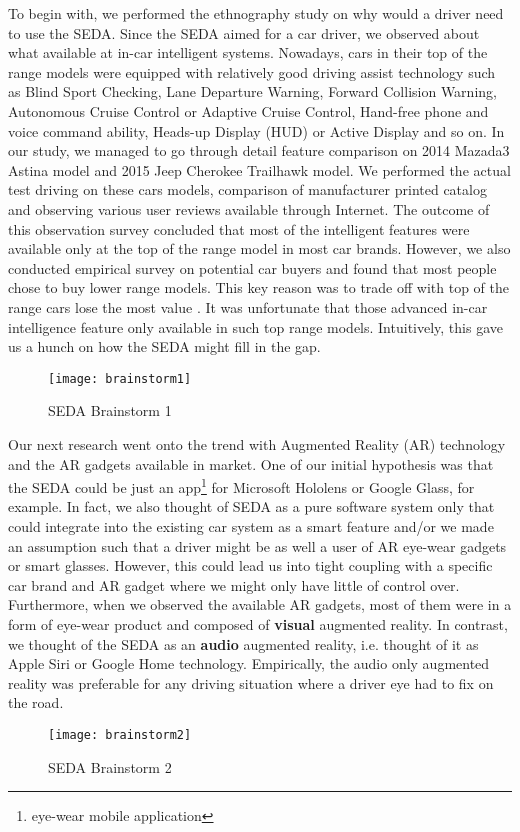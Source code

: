 \documentclass[main.tex]{subfiles}
\begin{document}
To begin with, we performed the ethnography study on why would a driver  need to use the SEDA. Since the SEDA aimed for a car driver, we observed about what available at in-car intelligent systems. Nowadays, cars in their top of the range models were equipped with relatively good driving assist technology such as Blind Sport Checking, Lane Departure Warning, Forward Collision Warning, Autonomous Cruise Control or Adaptive Cruise Control, Hand-free phone and voice command ability, Heads-up Display (HUD) or Active Display and so on. In our study, we managed to go through detail feature comparison on 2014 Mazada3 Astina model and 2015 Jeep Cherokee Trailhawk model. We performed the actual test driving on these cars models, comparison of manufacturer printed catalog and observing various user reviews available through Internet. The outcome of this observation survey concluded that most of the intelligent features were available only at the top of the range model in most car brands. However, we also conducted empirical survey  on potential car buyers and found that most people chose to buy lower range models. This key reason was to trade off with top of the range cars lose the most value \cite{carbuy1, carbuy2}. It was unfortunate that those advanced in-car intelligence feature only available in such top range models. Intuitively, this gave us a hunch on how the SEDA might fill in the gap.
\\

\begin{figure}
\caption{SEDA Brainstorm 1}
\centering
\texttt{[image: brainstorm1]}
\end{figure}

Our next research went onto the trend with Augmented Reality (AR) technology and the AR gadgets available in market. One of our initial hypothesis was that the SEDA could be just an app\footnote{eye-wear mobile application} for Microsoft Hololens or Google Glass, for example. In fact, we also thought of SEDA as a pure software system only that could integrate into the existing car system as a smart feature and/or we made an assumption such that a driver might be as well a user of AR eye-wear gadgets or smart glasses. However, this could lead us into tight coupling with a specific car brand and AR gadget where we might only have little of control over. Furthermore, when we observed the available AR gadgets, most of them were in a form of eye-wear product and composed of \textbf{visual} augmented reality. In contrast, we thought of the SEDA as an \textbf{audio} augmented reality, i.e. thought of it as Apple Siri or Google Home technology. Empirically, the audio only augmented reality was preferable for any driving situation where a driver eye had to fix on the road.
\\

\begin{figure}
\caption{SEDA Brainstorm 2}
\centering
\texttt{[image: brainstorm2]}
\end{figure}
\end{document}
